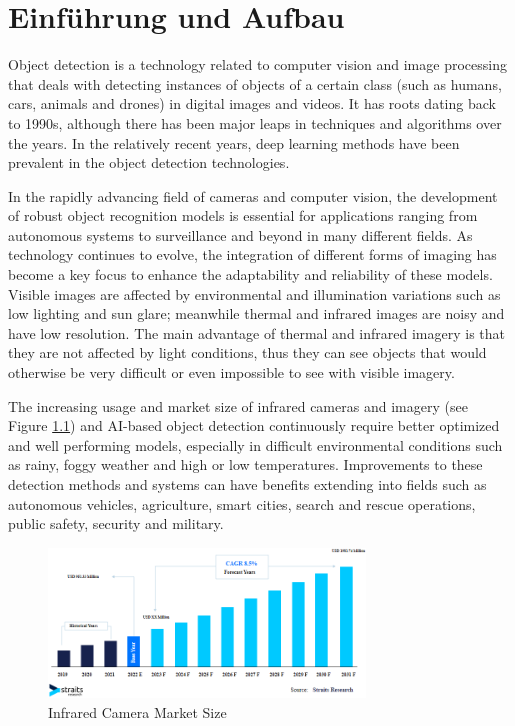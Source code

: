 \chapter{Einführung und Aufbau}
\label{cha:Einführung}

Object detection is a technology related to computer vision and image processing that deals with detecting instances of objects of a certain class (such as humans, cars, animals and drones) in digital images and videos. It has roots dating back to 1990s, although there has been major leaps in techniques and algorithms over the years. In the relatively recent years, deep learning methods have been prevalent in the object detection technologies.

In the rapidly advancing field of cameras and computer vision, the development of robust object recognition models is essential for applications ranging from autonomous systems to surveillance and beyond in many different fields. As technology continues to evolve, the integration of different forms of imaging has become a key focus to enhance the adaptability and reliability of these models. Visible images are affected by environmental and illumination variations such as low lighting and sun glare; meanwhile thermal and infrared images are noisy and have low resolution. \cite[p.1]{systematicreview23} The main advantage of thermal and infrared imagery is that they are not affected by light conditions, thus they can see objects that would otherwise be very difficult or even impossible to see with visible imagery.

The increasing usage and market size of infrared cameras and imagery (see Figure \ref{fig:marketsize}) and AI-based object detection continuously require better optimized and well performing models, especially in difficult environmental conditions such as rainy, foggy weather and high or low temperatures. Improvements to these detection methods and systems can have benefits extending into fields such as autonomous vehicles, agriculture, smart cities, search and rescue operations, public safety, security and military. 

\begin{figure}[!ht]
	\centering
		\includegraphics[width=0.75\textwidth]{images/straitsresearch_infrared_camera_marketsize.png}
	\caption{Infrared Camera Market Size \citep{infraredcameramarket}}
	\label{fig:marketsize}
\end{figure}

